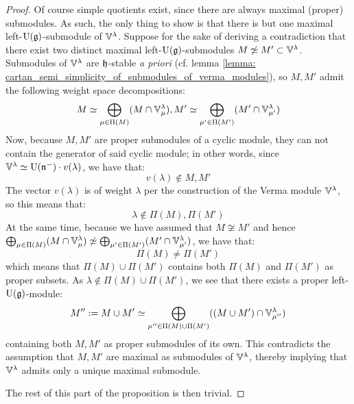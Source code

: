             \begin{proof}
                Of course simple quotients exist, since there are always maximal (proper) submodules. As such, the only thing to show is that there is but one maximal left-$\mathrm{U}(\mathfrak{g})$-submodule of $\mathbb{V}^{\lambda}$. Suppose for the sake of deriving a contradiction that there exist two distinct maximal left-$\mathrm{U}(\mathfrak{g})$-submodules $M \not \simeq M' \subset \mathbb{V}^{\lambda}$. Submodules of $\mathbb{V}^{\lambda}$ are $\mathfrak{h}$-stable \textit{a priori} (cf. lemma \ref{lemma: cartan_semi_simplicity_of_submodules_of_verma_modules}), so $M, M'$ admit the following weight space decompositions:
                    $$M \simeq \bigoplus_{\mu \in \Pi(M)} (M \cap \mathbb{V}^{\lambda}_{\mu}), M' \simeq \bigoplus_{\mu' \in \Pi(M')} (M' \cap \mathbb{V}^{\lambda}_{\mu'})$$
                Now, because $M, M'$ are proper submodules of a cyclic module, they can not contain the generator of said cyclic module; in other words, since $\mathbb{V}^{\lambda} \simeq \mathrm{U}(\mathfrak{n}^-) \cdot v(\lambda)$, we have that:
                    $$v(\lambda) \not \in M, M'$$
                The vector $v(\lambda)$ is of weight $\lambda$ per the construction of the Verma module $\mathbb{V}^{\lambda}$, so this means that:
                    $$\lambda \not \in \Pi(M), \Pi(M')$$
                At the same time, because we have assumed that $M \not \cong M'$ and hence $\bigoplus_{\mu \in \Pi(M)} (M \cap \mathbb{V}^{\lambda}_{\mu}) \not \simeq \bigoplus_{\mu' \in \Pi(M')} (M' \cap \mathbb{V}^{\lambda}_{\mu'})$, we have that:
                    $$\Pi(M) \not = \Pi(M')$$
                which means that $\Pi(M) \cup \Pi(M')$ contains both $\Pi(M)$ and $\Pi(M')$ as proper subsets. As $\lambda \not \in \Pi(M) \cup \Pi(M')$, we see that there exists a proper left-$\mathrm{U}(\mathfrak{g})$-module:
                    $$M'' := M \cup M' \simeq \bigoplus_{\mu'' \in \Pi(M) \cup \Pi(M')} ( (M \cup M') \cap \mathbb{V}^{\lambda}_{\mu''})$$
                containing both $M, M'$ as proper submodules of its own. This contradicts the assumption that $M, M'$ are maximal as submodules of $\mathbb{V}^{\lambda}$, thereby implying that $\mathbb{V}^{\lambda}$ admits only a unique maximal submodule.

                The rest of this part of the proposition is then trivial. 
            \end{proof}

